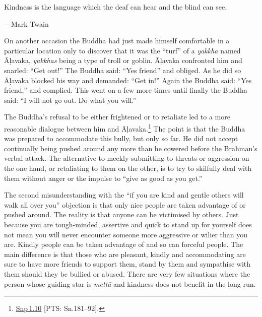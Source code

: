 \documentclass[10pt, openright]{book}
\newenvironment{epigram-2}%
{%
\vspace{1em}
\noindent
\quoting[leftmargin=2.5cm,rightmargin=2.5cm]%
\begin{itshape}
\large
}%
{\end{itshape}\endquoting
}%
\newenvironment{epigram-2-cite}%
{%
\quoting[leftmargin=2.5cm,rightmargin=2.5cm]%
\noindent\normal\hspace*{\fill} 
}%
{\endquoting\vspace{1em}
}%
\begin{document}
\begin{epigram-2}
Kindness is the language which the deaf can hear and the blind can see.
\end{epigram-2}

\begin{epigram-2-cite}
—Mark Twain
\end{epigram-2-cite}

On another occasion the Buddha had just made himself comfortable in a particular location only to discover that it was the “turf” of a \textit{yakkha} named Āḷavaka, \textit{yakkhas} being a type of troll or goblin. Āḷavaka confronted him and snarled: “Get out!” The Buddha said: “Yes friend” and obliged. As he did so Āḷavaka blocked his way and demanded: “Get in!” Again the Buddha said: “Yes friend,” and complied. This went on a few more times until finally the Buddha said: “I will not go out. Do what you will.”


The Buddha’s refusal to be either frightened or to retaliate led to a more reasonable dialogue between him and Āḷavaka.\footnote {\href{https://suttacentral.net/snp1.10/en/sujato}{Snp 1.10} [PTS: Sn.181–92].} The point is that the Buddha was prepared to accommodate this bully, but only so far. He did not accept continually being pushed around any more than he cowered before the Brahman’s verbal attack. The alternative to meekly submitting to threats or aggression on the one hand, or retaliating to them on the other, is to try to skilfully deal with them without anger or the impulse to “give as good as you get.”


The second misunderstanding with the “if you are kind and gentle others will walk all over you” objection is that only nice people are taken advantage of or pushed around. The reality is that anyone can be victimised by others. Just because you are tough-minded, assertive and quick to stand up for yourself does not mean you will never encounter someone more aggressive or wilier than you are. Kindly people can be taken advantage of and so can forceful people. The main difference is that those who are pleasant, kindly and accommodating are sure to have more friends to support them, stand by them and sympathise with them should they be bullied or abused. There are very few situations where the person whose guiding star is \textit{mettā} and kindness does not benefit in the long run.
\end{document}
